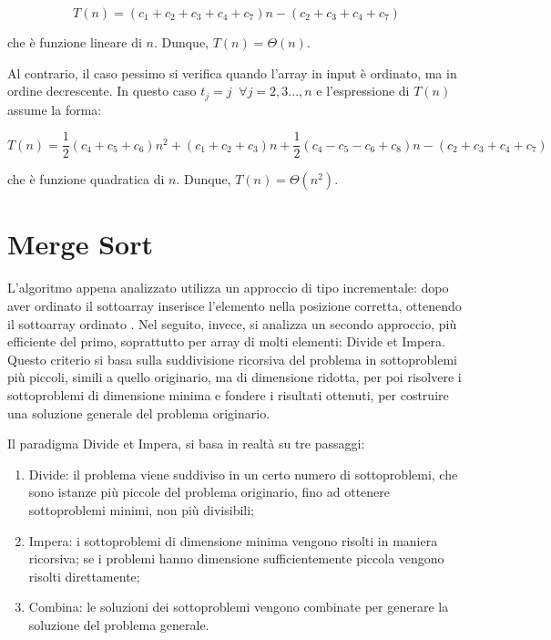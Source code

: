 \begin{equation*}
  T(n) = (c_1+c_2+c_3+c_4+c_7)n - (c_2+c_3+c_4+c_7)
\end{equation*}

che è funzione lineare di \(n\). Dunque, \(T(n)=\Theta(n)\).

Al contrario, il caso pessimo si verifica quando l'array in input è ordinato, ma in ordine decrescente. In questo caso \(t_j = j \;\; \forall j=2,3...,n\) e l'espressione di \(T(n)\) assume la forma:

\begin{equation*}
  T(n) = \frac{1}{2}(c_4+c_5+c_6)n^2+(c_1+c_2+c_3)n+\frac{1}{2}(c_4-c_5-c_6+c_8)n-(c_2+c_3+c_4+c_7)
\end{equation*}

che è funzione quadratica di \(n\). Dunque, \(T(n)=\Theta(n^2)\).

\section{Merge Sort}
L'algoritmo appena analizzato utilizza un approccio di tipo incrementale: dopo aver ordinato il sottoarray  inserisce l'elemento  nella posizione corretta, ottenendo il sottoarray ordinato . Nel seguito, invece, si analizza un secondo approccio, più efficiente del primo, soprattutto per array di molti elementi: Divide et Impera. Questo criterio si basa sulla suddivisione ricorsiva del problema in sottoproblemi più piccoli, simili a quello originario, ma di dimensione ridotta, per poi risolvere i sottoproblemi di dimensione minima e fondere i risultati ottenuti, per costruire una soluzione generale del problema originario. 

Il paradigma Divide et Impera, si basa in realtà su tre passaggi:
\begin{enumerate}
  \item Divide: il problema viene suddiviso in un certo numero di sottoproblemi, che sono istanze più piccole del problema originario, fino ad ottenere sottoproblemi minimi, non più divisibili;
  \item Impera: i sottoproblemi di dimensione minima vengono risolti in maniera ricorsiva; se i problemi hanno dimensione sufficientemente piccola vengono risolti direttamente;
  \item Combina: le soluzioni dei sottoproblemi vengono combinate per generare la soluzione del problema generale.
\end{enumerate}

